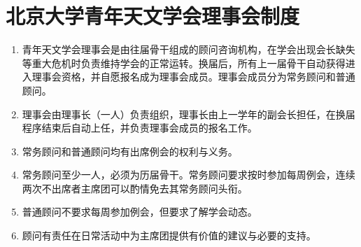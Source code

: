\chapter{北京大学青年天文学会理事会制度}

\begin{enumerate}
    \item 青年天文学会理事会是由往届骨干组成的顾问咨询机构，在学会出现会长缺失等重大危机时负责维持学会的正常运转。换届后，所有上一届骨干自动获得进入理事会资格，并自愿报名成为理事会成员。理事会成员分为常务顾问和普通顾问。
    
    \item 理事会由理事长（一人）负责组织，理事长由上一学年的副会长担任，在换届程序结束后自动上任，并负责理事会成员的报名工作。
    
    \item 常务顾问和普通顾问均有出席例会的权利与义务。
    
    \item 常务顾问至少一人，必须为历届骨干。常务顾问要求按时参加每周例会，连续两次不出席者主席团可以酌情免去其常务顾问头衔。
    
    \item 普通顾问不要求每周参加例会，但要求了解学会动态。
    
    \item 顾问有责任在日常活动中为主席团提供有价值的建议与必要的支持。
\end{enumerate}
